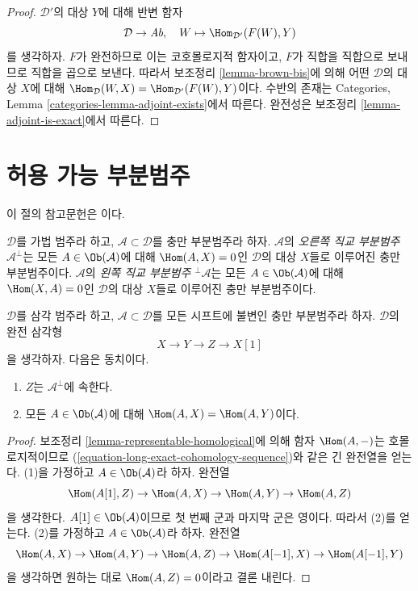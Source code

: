 \begin{proof}
$\mathcal{D}'$의 대상 $Y$에 대해 반변 함자
$$
\mathcal{D} \to \textit{Ab},\quad W \mapsto \Hom_{\mathcal{D}'}(F(W), Y)
$$
를 생각하자. $F$가 완전하므로 이는 코호몰로지적 함자이고, $F$가
직합을 직합으로 보내므로 직합을 곱으로 보낸다. 따라서 보조정리
\ref{lemma-brown-bis}에 의해 어떤 $\mathcal{D}$의 대상 $X$에 대해
$\Hom_\mathcal{D}(W, X) = \Hom_{\mathcal{D}'}(F(W), Y)$이다.
수반의 존재는 Categories, Lemma \ref{categories-lemma-adjoint-exists}에서
따른다. 완전성은 보조정리 \ref{lemma-adjoint-is-exact}에서 따른다.
\end{proof}

\section{허용 가능 부분범주}
\label{section-admissible}

\noindent
이 절의 참고문헌은 \cite[Section 1]{Bondal-Kapranov}이다.

\begin{definition}
\label{definition-orthogonal}
$\mathcal{D}$를 가법 범주라 하고, $\mathcal{A} \subset \mathcal{D}$를
충만 부분범주라 하자. $\mathcal{A}$의 {\it 오른쪽 직교 부분범주}
$\mathcal{A}^\perp$는 모든 $A \in \Ob(\mathcal{A})$에 대해
$\Hom(A, X) = 0$인 $\mathcal{D}$의 대상 $X$들로 이루어진 충만
부분범주이다. $\mathcal{A}$의 {\it 왼쪽 직교 부분범주}
${}^\perp\mathcal{A}$는 모든 $A \in \Ob(\mathcal{A})$에 대해
$\Hom(X, A) = 0$인 $\mathcal{D}$의 대상 $X$들로 이루어진 충만
부분범주이다.
\end{definition}

\begin{lemma}
\label{lemma-pre-prepare-adjoint}
$\mathcal{D}$를 삼각 범주라 하고, $\mathcal{A} \subset \mathcal{D}$를
모든 시프트에 불변인 충만 부분범주라 하자. $\mathcal{D}$의 완전 삼각형
$$
X \to Y \to Z \to X[1]
$$
을 생각하자. 다음은 동치이다.
\begin{enumerate}
\item $Z$는 $\mathcal{A}^\perp$에 속한다.
\item 모든 $A \in \Ob(\mathcal{A})$에 대해
$\Hom(A, X) = \Hom(A, Y)$이다.
\end{enumerate}
\end{lemma}

\begin{proof}
보조정리 \ref{lemma-representable-homological}에 의해 함자
$\Hom(A, -)$는 호몰로지적이므로
(\ref{equation-long-exact-cohomology-sequence})와 같은 긴 완전열을
얻는다. (1)을 가정하고 $A \in \Ob(\mathcal{A})$라 하자. 완전열
$$
\Hom(A[1], Z) \to \Hom(A, X) \to \Hom(A, Y) \to \Hom(A, Z)
$$
을 생각한다. $A[1] \in \Ob(\mathcal{A})$이므로 첫 번째 군과 마지막
군은 영이다. 따라서 (2)를 얻는다. (2)를 가정하고
$A \in \Ob(\mathcal{A})$라 하자. 완전열
$$
\Hom(A, X) \to \Hom(A, Y) \to \Hom(A, Z) \to \Hom(A[-1], X) \to \Hom(A[-1], Y)
$$
을 생각하면 원하는 대로 $\Hom(A, Z) = 0$이라고 결론 내린다.
\end{proof}


